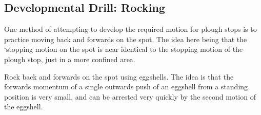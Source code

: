 \subsection{Developmental Drill: Rocking}
\label{drill:stopping/plough/rocking}

One method of attempting to develop the required motion for plough stops is to practice moving back and forwards on the spot. 
The idea here being that the `stopping motion on the spot is near identical to the stopping motion of the plough stop, just in a more confined area.

Rock back and forwards on the spot using eggshells. The idea is that the forwards momentum of a single outwards push of an eggshell from a standing position is very small, and can be arrested very quickly by the second motion of the eggshell.  
